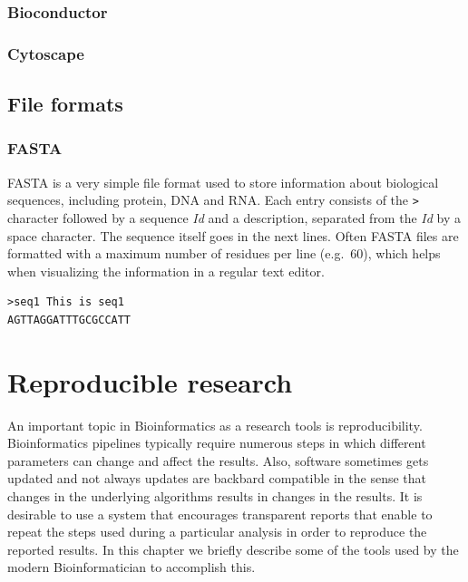 \documentclass[]{book}
\theoremstyle{definition}
\theoremstyle{definition}
\theoremstyle{definition}
\theoremstyle{remark}
\begin{document}
\subsection{Bioconductor}\label{bioconductor}

\subsection{Cytoscape}\label{cytoscape}

\section{File formats}\label{file-formats}

\subsection{FASTA}\label{fasta}

FASTA is a very simple file format used to store information about
biological sequences, including protein, DNA and RNA. Each entry
consists of the \texttt{\textgreater{}} character followed by a sequence
\emph{Id} and a description, separated from the \emph{Id} by a space
character. The sequence itself goes in the next lines. Often FASTA files
are formatted with a maximum number of residues per line (e.g.~60),
which helps when visualizing the information in a regular text editor.

\begin{verbatim}
>seq1 This is seq1
AGTTAGGATTTGCGCCATT
\end{verbatim}

\chapter{Reproducible research}\label{reproducible-research}

An important topic in Bioinformatics as a research tools is
reproducibility. Bioinformatics pipelines typically require numerous
steps in which different parameters can change and affect the results.
Also, software sometimes gets updated and not always updates are
backbard compatible in the sense that changes in the underlying
algorithms results in changes in the results. It is desirable to use a
system that encourages transparent reports that enable to repeat the
steps used during a particular analysis in order to reproduce the
reported results. In this chapter we briefly describe some of the tools
used by the modern Bioinformatician to accomplish this.
\end{document}
